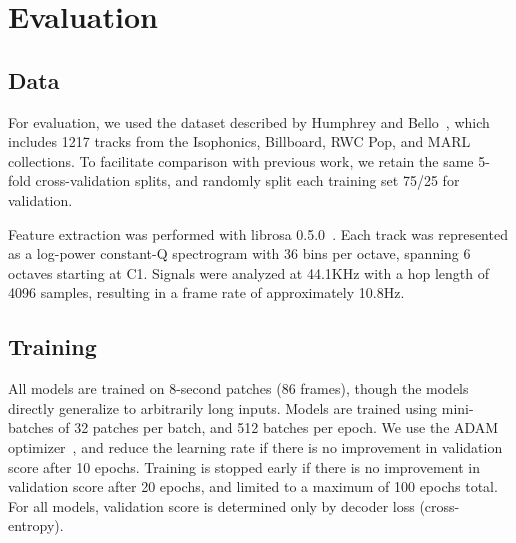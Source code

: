 \documentclass{article}
\begin{document}

\cite{mcfee2015software}

\section{Evaluation}

\subsection{Data}

For evaluation, we used the dataset described by Humphrey and Bello~\cite{humphrey2015four}, which includes 1217 tracks from the Isophonics, Billboard, RWC Pop, and MARL collections.
To facilitate comparison with previous work, we retain the same 5-fold cross-validation splits, and randomly split each training set 75/25 for validation.

Feature extraction was performed with librosa 0.5.0~\cite{librosa050}.
Each track was represented as a log-power constant-Q spectrogram with 36 bins per octave, spanning 6 octaves starting at C1.
Signals were analyzed at 44.1KHz with a hop length of 4096 samples, resulting in a frame rate of approximately 10.8Hz.

\subsection{Training}
All models are trained on 8-second patches (86 frames), though the models directly generalize to arbitrarily long inputs.
Models are trained using mini-batches of 32 patches per batch, and 512 batches per epoch.
We use the ADAM optimizer~\cite{kingma2014adam}, and reduce the learning rate if there is no improvement in validation score after 10 epochs.
Training is stopped early if there is no improvement in validation score after 20 epochs, and limited to a maximum of 100 epochs total.
For all models, validation score is determined only by decoder loss (cross-entropy).
\end{document}
